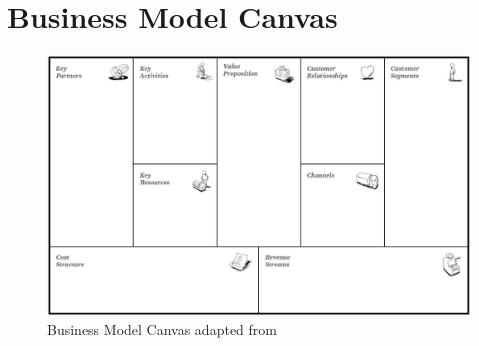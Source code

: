 \chapter{Business Model Canvas}\label{ch:app02}

\begin{figure}[htb]
	\centering
	\includegraphics[width=\textwidth]{gfx/businessModelCanvas}
	\caption[Business Model Canvas]{Business Model Canvas adapted from \citet[p. 44]{Osterwalder2010}}
	\label{fig:bmc}
\end{figure}